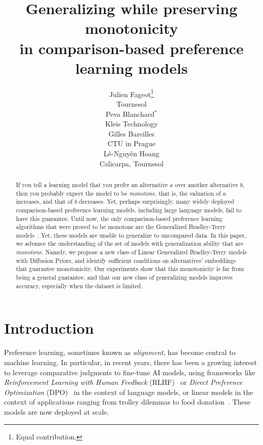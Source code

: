 \documentclass{article}
\title{Generalizing while preserving monotonicity \\ in comparison-based preference learning models}
\author{%
  Julien Fageot\thanks{Equal contribution.} \\
  Tournesol \\
  \And
  Peva Blanchard${}^{*}$ \\
  Kleis Technology \\
  \And
  Gilles Bareilles \\
  CTU in Prague \\
  \And
  Lê-Nguyên Hoang \\
  Calicarpa, Tournesol \\
}
\begin{document}
\maketitle

\begin{abstract}
    If you tell a learning model 
    that you prefer an alternative $a$ over another alternative $b$,
    then you probably expect the model to be \emph{monotone}, that is, the valuation of $a$ increases, 
    and that of $b$ decreases.
    Yet, perhaps surprisingly, many widely deployed comparison-based preference learning models, including large language models, fail to have this guarantee.
    Until now, the only comparison-based preference learning algorithms 
    that were proved to be monotone are the Generalized Bradley-Terry models~\cite{DBLP:conf/aaai/FageotFHV24}.
    Yet, these models are unable to generalize to uncompared data.
    In this paper, we advance the understanding of the set of models
    with generalization ability that are \emph{monotone}.
    Namely, we propose a new class of Linear Generalized Bradley-Terry models with Diffusion Priors,
    and identify sufficient conditions on alternatives' embeddings 
    that guarantee monotonicity.
    Our experiments show that this monotonicity is far from being a general guarantee,
    and that our new class of generalizing models improves accuracy,
    especially when the dataset is limited.
\end{abstract}





\section{Introduction}
\label{sec:intro}

Preference learning, sometimes known as \emph{alignment}, has become central to machine learning.
In particular, in recent years, there has been a growing interest to leverage comparative judgments to fine-tune AI models, using frameworks like \emph{Reinforcement Learning with Human Feedback} (RLHF)~\cite{DBLP:conf/nips/ChristianoLBMLA17} or \emph{Direct Preference Optimization} (DPO)~\cite{rafailovDirectPreferenceOptimization2024} in the context of language models, or linear models in the context of applications ranging from trolley dilemmas to food donation~\cite{awadMoralMachineExperiment2018,DBLP:journals/pacmhci/LeeKKKYCSNLPP19}.
These models are now deployed at scale.
\end{document}
